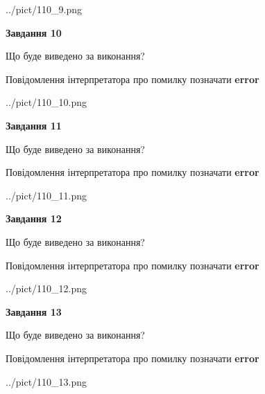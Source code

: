 \documentclass[11pt, ukrainian]{article}
\begin{document}
{\begin {large}
\begin{center}
	{../pict/110_9.png}
\end{center}
\newpage

{\begin {center}\textbf{Завдання 10}\end {center}}\par
Що буде виведено за виконання? \par
Повідомлення інтерпретатора про помилку позначати \textbf{error}

\begin{center}
	{../pict/110_10.png}
\end{center}
\newpage

{\begin {center}\textbf{Завдання 11}\end {center}}\par
Що буде виведено за виконання? \par
Повідомлення інтерпретатора про помилку позначати \textbf{error}

\begin{center}
	{../pict/110_11.png}
\end{center}
\newpage

{\begin {center}\textbf{Завдання 12}\end {center}}\par
Що буде виведено за виконання? \par
Повідомлення інтерпретатора про помилку позначати \textbf{error}

\begin{center}
	{../pict/110_12.png}
\end{center}
\newpage

{\begin {center}\textbf{Завдання 13}\end {center}}\par
Що буде виведено за виконання? \par
Повідомлення інтерпретатора про помилку позначати \textbf{error}

\begin{center}
	{../pict/110_13.png}
\end{center}
\newpage


\end{large}}
\end{document}
